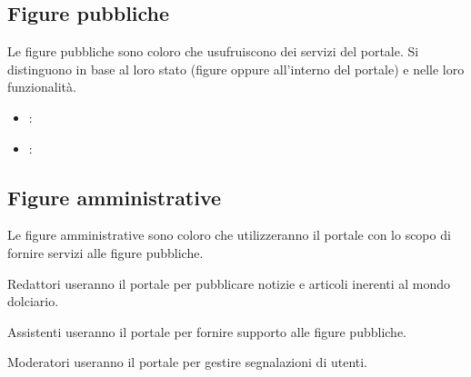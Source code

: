 
\subsection{Figure pubbliche}
\label{sub:figure_pubbliche}
Le figure pubbliche sono coloro che usufruiscono dei servizi del portale. Si distinguono in base al loro stato (figure  oppure  all'interno del portale) e nelle loro funzionalità. 
\begin{itemize}
	\item {}:

	\item {}:
\end{itemize}

\subsection{Figure amministrative}
\label{sub:figureamministrative}
Le figure amministrative sono coloro che utilizzeranno il portale con lo scopo di fornire servizi alle figure pubbliche.
\begin{descriptionInd}
    \item[Redattori] useranno il portale per pubblicare notizie e articoli inerenti al mondo dolciario.   
    \item[Assistenti] useranno il portale per fornire supporto alle figure pubbliche.
    \item[Moderatori] useranno il portale per gestire segnalazioni di utenti.
\end{descriptionInd}



